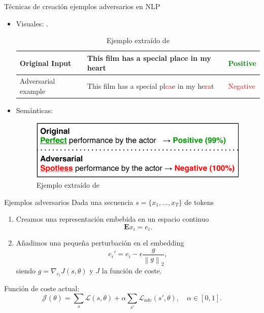 \documentclass[aspectratio=169]{beamer}
\newcommand{\norm}[1]{\left\lVert#1\right\rVert}
\begin{document}
  \begin{frame}{Técnicas de creación ejemplos adversarios en NLP}

    \begin{itemize}
      \item Visuales: \citep{DBLP:journals/corr/abs-2005-05909}.
      \begin{table}[H]
        \begin{tabular}{l|l|l}
        Original Input      & This film has a special place in my heart & \textcolor{green}{Positive} \\ \hline
        Adversarial example & This film has a special pl\textcolor{red}{ca}e in my he\textcolor{red}{ra}t & \textcolor{red}{Negative}
        \end{tabular}
        \caption{Ejemplo extraído de \citep{DBLP:journals/corr/abs-1801-04354}}
        \end{table}
      \item Semánticas:\citep{DBLP:journals/corr/abs-1907-11932}
      \begin{figure}[H]
        \centering
        \includegraphics[scale=0.5]{00-ae-example}
        \caption{Ejemplo extraído de \citep{DBLP:journals/corr/abs-1907-11932}}
      \end{figure}

    \end{itemize}
  \end{frame}

  \begin{frame}{Ejemplos adversarios}
    Dada una secuencia \(s = \{x_1,\dots,x_T\}\) de tokens
    \begin{enumerate}
      \item Creamos una representación embebida en un espacio continuo 
      \[
        \mathbf{E}x_i = e_i.  
      \]
      \item Añadimos una pequeña perturbación en el embedding
      \[
      e_i' = e_i - \epsilon \frac{g}{\norm{g}_2},   
      \]
      siendo \(g = \nabla_{e_i}J(s,\theta)\) y \(J\) la función de coste.
    \end{enumerate}

    Función de coste actual:
    \[
    \mathcal J(\theta) = \sum_s \mathcal L(s,\theta) + \alpha \sum_{s'} \mathcal L_{adv} (s',\theta), \quad \alpha \in [0,1].  
    \]
  \end{frame}
\end{document}
